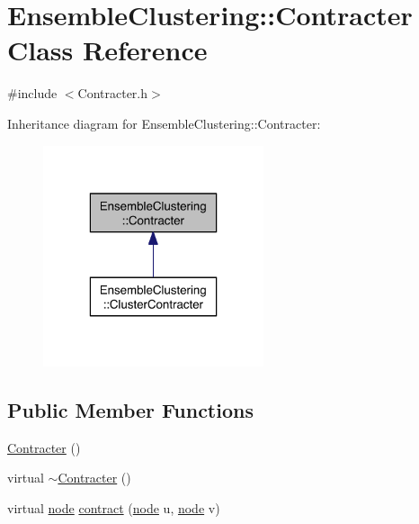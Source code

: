 \hypertarget{class_ensemble_clustering_1_1_contracter}{\section{Ensemble\-Clustering\-:\-:Contracter Class Reference}
\label{class_ensemble_clustering_1_1_contracter}
}


{\ttfamily \#include $<$Contracter.\-h$>$}



Inheritance diagram for Ensemble\-Clustering\-:\-:Contracter\-:\nopagebreak
\begin{figure}[H]
\begin{center}
\leavevmode
\includegraphics[width=184pt]{class_ensemble_clustering_1_1_contracter__inherit__graph}
\end{center}
\end{figure}
\subsection*{Public Member Functions}
\begin{DoxyCompactItemize}
\item 
\hyperlink{class_ensemble_clustering_1_1_contracter_a191a4d23919919852f13b6ea391bde1c}{Contracter} ()
\item 
virtual \hyperlink{class_ensemble_clustering_1_1_contracter_ad147c8a5d4e76dea9ab43a06b4ac4429}{$\sim$\-Contracter} ()
\item 
virtual \hyperlink{namespace_ensemble_clustering_ae829290aeccd1a420b17a37fd901f114}{node} \hyperlink{class_ensemble_clustering_1_1_contracter_a1f14b1abca4f219cfdf105cd4e032760}{contract} (\hyperlink{namespace_ensemble_clustering_ae829290aeccd1a420b17a37fd901f114}{node} u, \hyperlink{namespace_ensemble_clustering_ae829290aeccd1a420b17a37fd901f114}{node} v)
\end{DoxyCompactItemize}


